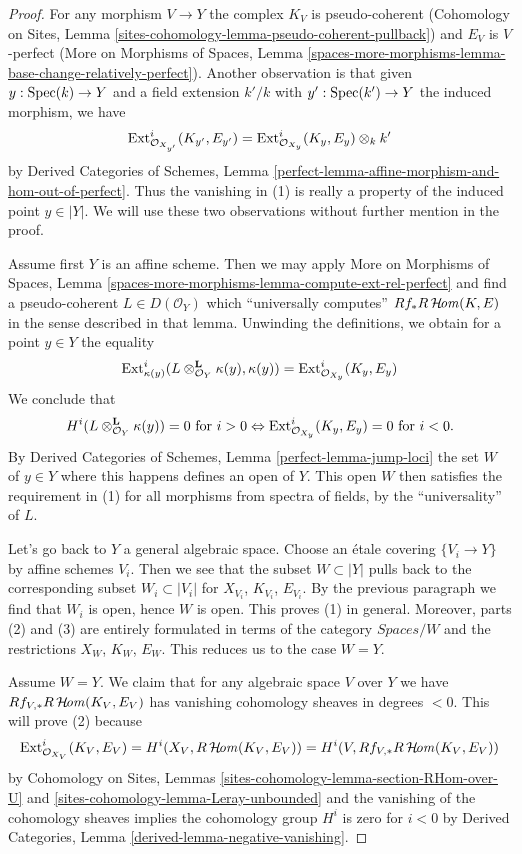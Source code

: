 \begin{proof}
For any morphism $V \to Y$ the complex $K_V$ is pseudo-coherent
(Cohomology on Sites, Lemma
\ref{sites-cohomology-lemma-pseudo-coherent-pullback})
and $E_V$ is $V$-perfect (More on Morphisms of Spaces, Lemma
\ref{spaces-more-morphisms-lemma-base-change-relatively-perfect}).
Another observation is that given $y : \mathop{\mathrm{Spec}}(k) \to Y$
and a field extension $k'/k$ with $y' : \mathop{\mathrm{Spec}}(k') \to Y$
the induced morphism, we have
$$
\mathop{\mathrm{Ext}}\nolimits^i_{\mathcal{O}_{X_{y'}}}(K_{y'}, E_{y'}) =
\mathop{\mathrm{Ext}}\nolimits^i_{\mathcal{O}_{X_y}}(K_y, E_y) \otimes_k k'
$$
by Derived Categories of Schemes, Lemma
\ref{perfect-lemma-affine-morphism-and-hom-out-of-perfect}.
Thus the vanishing in (1) is really a property of the induced
point $y \in |Y|$.
We will use these two observations without further mention in the proof.

\medskip\noindent
Assume first $Y$ is an affine scheme. Then we may apply
More on Morphisms of Spaces, Lemma
\ref{spaces-more-morphisms-lemma-compute-ext-rel-perfect}
and find a pseudo-coherent $L \in D(\mathcal{O}_Y)$ which
``universally computes'' $Rf_*R\mathop{\mathcal{H}\!\mathit{om}}\nolimits(K, E)$ in the sense
described in that lemma. Unwinding the definitions, we obtain
for a point $y \in Y$ the equality
$$
\mathop{\mathrm{Ext}}\nolimits^i_{\kappa(y)}(L \otimes_{\mathcal{O}_Y}^\mathbf{L} \kappa(y),
\kappa(y)) = \mathop{\mathrm{Ext}}\nolimits^i_{\mathcal{O}_{X_y}}(K_y, E_y)
$$
We conclude that
$$
H^i(L \otimes_{\mathcal{O}_Y}^\mathbf{L} \kappa(y)) = 0
\text{ for } i > 0 \Leftrightarrow
\mathop{\mathrm{Ext}}\nolimits^i_{\mathcal{O}_{X_y}}(K_y, E_y) = 0 \text{ for }i < 0.
$$
By Derived Categories of Schemes, Lemma \ref{perfect-lemma-jump-loci}
the set $W$ of $y \in Y$ where this happens defines an open of $Y$.
This open $W$ then satisfies the requirement in (1) for all morphisms
from spectra of fields, by the ``universality'' of $L$.

\medskip\noindent
Let's go back to $Y$ a general algebraic space.
Choose an \'etale covering $\{V_i \to Y\}$ by affine schemes $V_i$.
Then we see that the subset $W \subset |Y|$ pulls back to the corresponding
subset $W_i \subset |V_i|$ for $X_{V_i}$, $K_{V_i}$, $E_{V_i}$.
By the previous paragraph we find that $W_i$ is open, hence $W$ is open.
This proves (1) in general. Moreover, parts (2) and (3) are entirely formulated
in terms of the category $\textit{Spaces}/W$ and the restrictions
$X_W$, $K_W$, $E_W$. This reduces us to the case $W = Y$.

\medskip\noindent
Assume $W = Y$. We claim that for any algebraic space $V$ over $Y$
we have $Rf_{V, *}R\mathop{\mathcal{H}\!\mathit{om}}\nolimits(K_V, E_V)$ has vanishing cohomology
sheaves in degrees $< 0$. This will prove (2) because
$$
\mathop{\mathrm{Ext}}\nolimits^i_{\mathcal{O}_{X_V}}(K_V, E_V) =
H^i(X_V, R\mathop{\mathcal{H}\!\mathit{om}}\nolimits(K_V, E_V)) = 
H^i(V, Rf_{V, *}R\mathop{\mathcal{H}\!\mathit{om}}\nolimits(K_V, E_V))
$$
by Cohomology on Sites, Lemmas
\ref{sites-cohomology-lemma-section-RHom-over-U} and
\ref{sites-cohomology-lemma-Leray-unbounded}
and the vanishing of the cohomology sheaves implies the
cohomology group $H^i$ is zero for $i < 0$ by
Derived Categories, Lemma \ref{derived-lemma-negative-vanishing}.


\end{proof}

